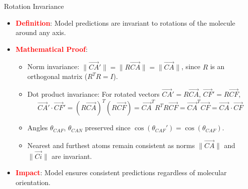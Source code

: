 \documentclass[10pt]{beamer}
\begin{document}
\begin{frame}{Rotation Invariance}
  \begin{itemize}
    \item \textcolor{red}{\textbf{Definition}}: Model predictions are invariant to rotations of the molecule around any axis.
    \vspace{0.3cm}
    \item \textcolor{red}{\textbf{Mathematical Proof}}:
      \begin{itemize}
        \item Norm invariance: \( \|\vec{CA}'\| = \|R \vec{CA}\| = \|\vec{CA}\| \), since \( R \) is an orthogonal matrix (\( R^T R = I \)).
        \vspace{0.3cm}
        \item Dot product invariance: For rotated vectors \( \vec{CA}' = R \vec{CA} \), \( \vec{CF}' = R \vec{CF} \),
          \[
          \vec{CA}' \cdot \vec{CF}' = (R \vec{CA})^T (R \vec{CF}) = \vec{CA}^T R^T R \vec{CF} = \vec{CA}^T \vec{CF} = \vec{CA} \cdot \vec{CF}
          \]
        \vspace{0.3cm}
        \item Angles \( \theta_{CAF} \), \( \theta_{CAN} \) preserved since \( \cos(\theta_{CAF}') = \cos(\theta_{CAF}) \).
        \vspace{0.3cm}
        \item Nearest and furthest atoms remain consistent as norms \( \|\vec{CA}\| \) and \( \|\vec{Ci}\| \) are invariant.
      \end{itemize}
    \vspace{0.3cm}
    \item \textcolor{red}{\textbf{Impact}}: Model ensures consistent predictions regardless of molecular orientation.
  \end{itemize}
\end{frame}
\end{document}
